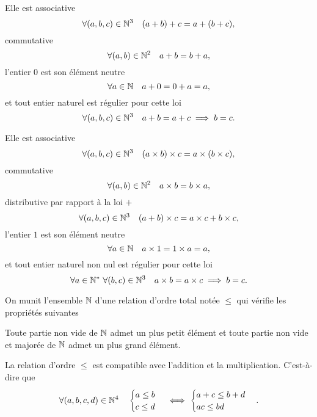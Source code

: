 \begin{prop}[Loi $+$]
  Elle est associative 
  \begin{equation}
    \forall (a,b,c) \in \mathbb{N}^3 \quad (a+b)+c=a+(b+c),
  \end{equation}
  commutative
  \begin{equation}
    \forall (a,b) \in \mathbb{N}^2 \quad a+b=b+a,
  \end{equation}
  l'entier $0$ est son élément neutre
  \begin{equation}
    \forall a \in \mathbb{N} \quad a+0=0+a=a,
  \end{equation}
  et tout entier naturel est régulier pour cette loi
  \begin{equation}
    \forall (a,b,c) \in \mathbb{N}^3 \quad a+b=a+c \implies b=c.
  \end{equation}
\end{prop}
\begin{prop}
  Elle est associative 
  \begin{equation}
    \forall (a,b,c) \in \mathbb{N}^3 \quad (a\times b)\times c=a\times (b\times c),
  \end{equation}
  commutative
  \begin{equation}
    \forall (a,b) \in \mathbb{N}^2 \quad a\times b=b\times a,
  \end{equation}
  distributive par rapport à la loi $+$
  \begin{equation}
    \forall (a,b,c) \in \mathbb{N}^3 \quad (a+ b)\times c=a\times c + b\times c,
  \end{equation}
  l'entier $1$ est son élément neutre
  \begin{equation}
    \forall a \in \mathbb{N} \quad a\times 1=1\times a=a,
  \end{equation}
  et tout entier naturel non nul est régulier pour cette loi
  \begin{equation}
    \forall a \in \mathbb{N}^* \ \forall (b,c) \in \mathbb{N}^3 \quad a\times b=a\times c \implies b=c.
  \end{equation}
\end{prop}
On munit l'ensemble $\mathbb{N}$ d'une relation d'ordre total notée $\leq$ qui vérifie les propriétés suivantes
\begin{prop}
  Toute partie non vide de $\mathbb{N}$ admet un plus petit élément et toute partie non vide et majorée de $\mathbb{N}$ admet un plus grand élément.
\end{prop}
\begin{prop}
  La relation d'ordre $\leq$ est compatible avec l'addition et la multiplication. C'est-à-dire que
  \begin{equation}
    \forall (a,b,c,d)\in \mathbb{N}^4 \quad
    \begin{cases}
      a\leq b \\ c \leq d
    \end{cases}
    \iff
    \begin{cases}
      a+c\leq b+d \\ ac\leq bd
    \end{cases}.
  \end{equation}
\end{prop}

